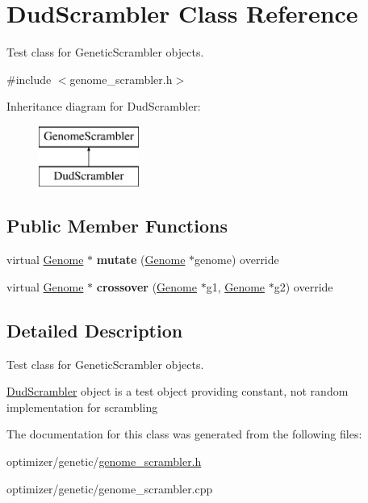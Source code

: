 \hypertarget{class_dud_scrambler}{}\section{Dud\+Scrambler Class Reference}
\label{class_dud_scrambler}


Test class for Genetic\+Scrambler objects.  




{\ttfamily \#include $<$genome\+\_\+scrambler.\+h$>$}

Inheritance diagram for Dud\+Scrambler\+:\begin{figure}[H]
\begin{center}
\leavevmode
\includegraphics[height=2.000000cm]{class_dud_scrambler}
\end{center}
\end{figure}
\subsection*{Public Member Functions}
\begin{DoxyCompactItemize}
\item 
\mbox{\label{class_dud_scrambler_a9fd7e425f2ca563c7c72ae0e1926e238}} 
virtual \hyperlink{class_genome}{Genome} $\ast$ {\bfseries mutate} (\hyperlink{class_genome}{Genome} $\ast$genome) override
\item 
\mbox{\label{class_dud_scrambler_a6d3491d703d0b3a60316349d97d1587a}} 
virtual \hyperlink{class_genome}{Genome} $\ast$ {\bfseries crossover} (\hyperlink{class_genome}{Genome} $\ast$g1, \hyperlink{class_genome}{Genome} $\ast$g2) override
\end{DoxyCompactItemize}


\subsection{Detailed Description}
Test class for Genetic\+Scrambler objects. 

\hyperlink{class_dud_scrambler}{Dud\+Scrambler} object is a test object providing constant, not random implementation for scrambling 

The documentation for this class was generated from the following files\+:\begin{DoxyCompactItemize}
\item 
optimizer/genetic/\hyperlink{genome__scrambler_8h}{genome\+\_\+scrambler.\+h}\item 
optimizer/genetic/genome\+\_\+scrambler.\+cpp\end{DoxyCompactItemize}
